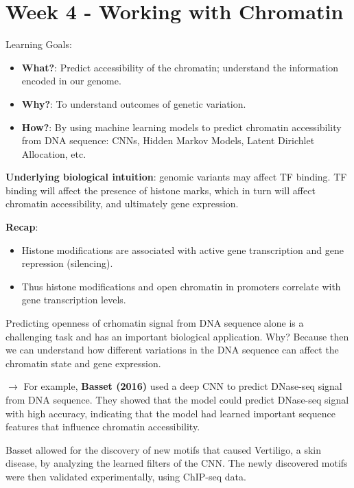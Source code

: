 \documentclass[a4paper]{article}
\begin{document}
\newpage

\section*{Week 4 - Working with Chromatin}

Learning Goals:

\begin{itemize}
  \item \textbf{What?}: Predict accessibility of the chromatin; 
  understand the information encoded in our genome.

  \item \textbf{Why?}: To understand outcomes of genetic variation.
  
  \item \textbf{How?}: By using machine learning models to predict chromatin
  accessibility from DNA sequence: CNNs, Hidden Markov Models, Latent
  Dirichlet Allocation, etc.
\end{itemize}

\textbf{Underlying biological intuition}: genomic variants may affect TF binding.
TF binding will affect the presence of histone marks, which in turn will affect
chromatin accessibility, and ultimately gene expression.

\textbf{Recap}:

\begin{itemize}
  \item Histone modifications are associated with active gene transcription and
  gene repression (silencing).

  \item Thus histone modifications and open chromatin in promoters correlate
  with gene transcription levels.

\end{itemize}

Predicting openness of crhomatin signal from DNA sequence alone is a challenging
task and has an important biological application. Why? Because then we can
understand how different variations in the DNA sequence can affect the chromatin
state and gene expression.

$\rightarrow$ For example, \textbf{Basset (2016)} used a deep CNN to predict
DNase-seq signal from DNA sequence. They showed that the model could predict
DNase-seq signal with high accuracy, indicating that the model had learned
important sequence features that influence chromatin accessibility.

Basset allowed for the discovery of new motifs that caused Vertiligo, a skin
disease, by analyzing the learned filters of the CNN. The newly discovered motifs
were then validated experimentally, using ChIP-seq data.
\end{document}
